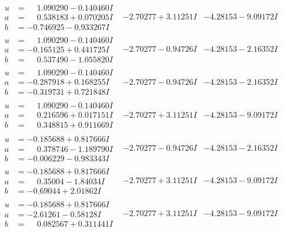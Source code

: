 \documentclass[1p]{elsarticle_modified}
\theoremstyle{definition}
\begin{document}
$$\begin{array}{c|c|c}
\begin{aligned}
u &= \phantom{-}1.090290 - 0.140460 I \\
a &= \phantom{-}0.538183 + 0.070205 I \\
b &= -0.746925 - 0.933267 I\end{aligned}
 & -2.70277 + 3.11251 I & -4.28153 - 9.09172 I \\ \hline\begin{aligned}
u &= \phantom{-}1.090290 - 0.140460 I \\
a &= -0.165125 + 0.441725 I \\
b &= \phantom{-}0.537490 - 1.055820 I\end{aligned}
 & -2.70277 - 0.94726 I & -4.28153 - 2.16352 I \\ \hline\begin{aligned}
u &= \phantom{-}1.090290 - 0.140460 I \\
a &= -0.287918 + 0.168255 I \\
b &= -0.319731 + 0.721848 I\end{aligned}
 & -2.70277 - 0.94726 I & -4.28153 - 2.16352 I \\ \hline\begin{aligned}
u &= \phantom{-}1.090290 - 0.140460 I \\
a &= \phantom{-}0.216596 + 0.017151 I \\
b &= \phantom{-}0.348815 + 0.911669 I\end{aligned}
 & -2.70277 + 3.11251 I & -4.28153 - 9.09172 I \\ \hline\begin{aligned}
u &= -0.185688 + 0.817666 I \\
a &= \phantom{-}0.378746 - 1.189790 I \\
b &= -0.006229 - 0.983343 I\end{aligned}
 & -2.70277 - 0.94726 I & -4.28153 - 2.16352 I \\ \hline\begin{aligned}
u &= -0.185688 + 0.817666 I \\
a &= \phantom{-}0.35004 - 1.84034 I \\
b &= -0.69044 + 2.01862 I\end{aligned}
 & -2.70277 + 3.11251 I & -4.28153 - 9.09172 I \\ \hline\begin{aligned}
u &= -0.185688 + 0.817666 I \\
a &= -2.61261 - 0.58128 I \\
b &= \phantom{-}0.082567 + 0.311441 I\end{aligned}
 & -2.70277 + 3.11251 I & -4.28153 - 9.09172 I \\ \hline\begin{aligned}

\end{aligned}
\end{array}$$
\end{document}
